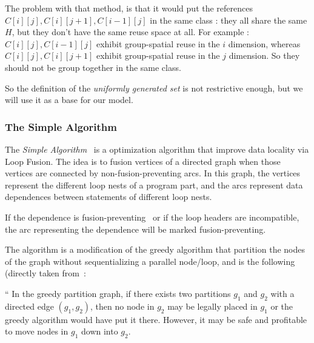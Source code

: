 \documentclass[paper=a4, fontsize=11.5pt]{scrartcl}
\numberwithin{equation}{section}        %
\numberwithin{figure}{section}          %
\numberwithin{table}{section}               %
\begin{document}
            The problem with that method, is that it would put the references
            $C[i][j],C[i][j+1],C[i-1][j]$ in the same class : they all share the
            same $H$, but they don't have the same reuse space at all.
            For example : $C[i][j],C[i-1][j]$ exhibit group-spatial reuse in the $i$ dimension,
            whereas $C[i][j],C[i][j+1]$ exhibit group-spatial reuse in the $j$ dimension. So they
            should not be group together in the same class.
            \medskip

            So the definition of the \textit{uniformly generated set} is not restrictive enough,
            but we will use it as a base for our model.



        \subsubsection{The Simple Algorithm}
            The \textit{Simple Algorithm}~\cite{Kennedy94maximizingloop} is a
            optimization algorithm that improve data locality via Loop Fusion.
            The idea is to fusion vertices of a directed graph when those vertices
            are connected by non-fusion-preventing arcs.
            In this graph, the vertices represent the different loop nests of a program part,
            and the arcs represent data dependences between statements of different loop nests.

            If the dependence is fusion-preventing~\cite{Bacon:1994:CTH:197405.197406} or if the loop headers are incompatible,
            the arc representing the dependence will be marked fusion-preventing.

            The algorithm is a modification of the greedy algorithm that partition
            the nodes of the graph without sequentializing a parallel node/loop, and
            is the following (directly taken from~\cite{Kennedy94maximizingloop}:
            \medskip

            ``  In the greedy partition graph, if there exists two partitions $g_1$
                and $g_2$ with a directed edge $(g_1,g_2)$, then no node in $g_2$
                may be legally placed in $g_1$ or the greedy algorithm would have put it
                there. However, it may be safe and profitable to move nodes in $g_1$
                down into $g_2$.
\end{document}
